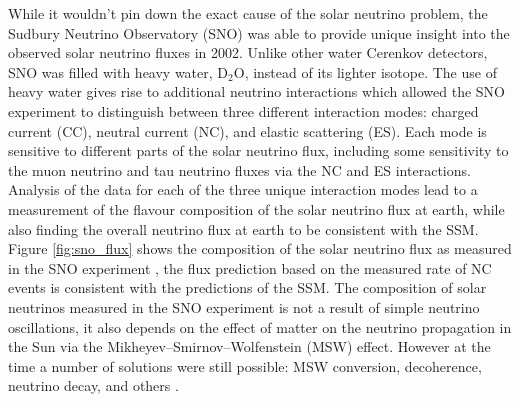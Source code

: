 While it wouldn't pin down the exact cause of the solar neutrino problem, the
Sudbury Neutrino Observatory (SNO) was able to provide unique insight into the 
observed solar neutrino fluxes in 2002. Unlike other water Cerenkov detectors, 
SNO was filled with heavy water, \(\mbox{D}_2\mbox{O}\), instead of its 
lighter isotope. The use of heavy water gives rise to additional neutrino 
interactions which allowed the SNO experiment to distinguish between three 
different interaction modes: charged current (CC), neutral current (NC), and 
elastic scattering (ES). Each mode is sensitive to different parts of the 
solar neutrino flux, including some sensitivity to the muon neutrino and tau 
neutrino fluxes via the NC and ES interactions. Analysis of the data for each 
of the three unique interaction modes lead to a measurement of the flavour 
composition of the solar neutrino flux at earth, while also finding the 
overall neutrino flux at earth to be consistent with the SSM.  Figure 
\ref{fig:sno_flux} shows the composition of the solar neutrino flux as 
measured in the SNO experiment \cite{Ahmad2002}, the flux prediction based on 
the measured rate of NC events is consistent with the predictions of the SSM. 
The composition of solar neutrinos measured in the SNO experiment is not a 
result of simple neutrino oscillations, it also depends on the effect of matter 
on the neutrino propagation in the Sun via the Mikheyev–Smirnov–Wolfenstein 
(MSW) effect. However at the time a number of solutions were still possible: 
MSW conversion, decoherence, neutrino decay, and others \cite{Smirnov:2016xzf}. 

